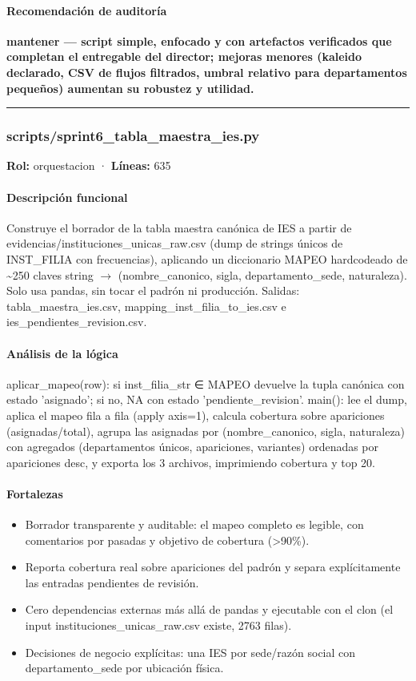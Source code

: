 \paragraph{Recomendación de auditoría}
\textbf{mantener --- script simple, enfocado y con artefactos verificados que completan el entregable del director; mejoras menores (kaleido declarado, CSV de flujos filtrados, umbral relativo para departamentos pequeños) aumentan su robustez y utilidad.}

\medskip
\hrule

\subsubsection{scripts/sprint6\_tabla\_maestra\_ies.py}
\textbf{Rol:} orquestacion · \textbf{Líneas:} 635

\paragraph{Descripción funcional}
Construye el borrador de la tabla maestra canónica de IES a partir de evidencias/instituciones\_unicas\_raw.csv (dump de strings únicos de INST\_FILIA con frecuencias), aplicando un diccionario MAPEO hardcodeado de \textasciitilde{}250 claves string $\rightarrow$ (nombre\_canonico, sigla, departamento\_sede, naturaleza). Solo usa pandas, sin tocar el padrón ni producción. Salidas: tabla\_maestra\_ies.csv, mapping\_inst\_filia\_to\_ies.csv e ies\_pendientes\_revision.csv.

\paragraph{Análisis de la lógica}
aplicar\_mapeo(row): si inst\_filia\_str ∈ MAPEO devuelve la tupla canónica con estado 'asignado'; si no, NA con estado 'pendiente\_revision'. main(): lee el dump, aplica el mapeo fila a fila (apply axis=1), calcula cobertura sobre apariciones (asignadas/total), agrupa las asignadas por (nombre\_canonico, sigla, naturaleza) con agregados (departamentos únicos, apariciones, variantes) ordenadas por apariciones desc, y exporta los 3 archivos, imprimiendo cobertura y top 20.

\paragraph{Fortalezas}
\begin{itemize}
  \item Borrador transparente y auditable: el mapeo completo es legible, con comentarios por pasadas y objetivo de cobertura (>90\%).
  \item Reporta cobertura real sobre apariciones del padrón y separa explícitamente las entradas pendientes de revisión.
  \item Cero dependencias externas más allá de pandas y ejecutable con el clon (el input instituciones\_unicas\_raw.csv existe, 2763 filas).
  \item Decisiones de negocio explícitas: una IES por sede/razón social con departamento\_sede por ubicación física.
\end{itemize}

